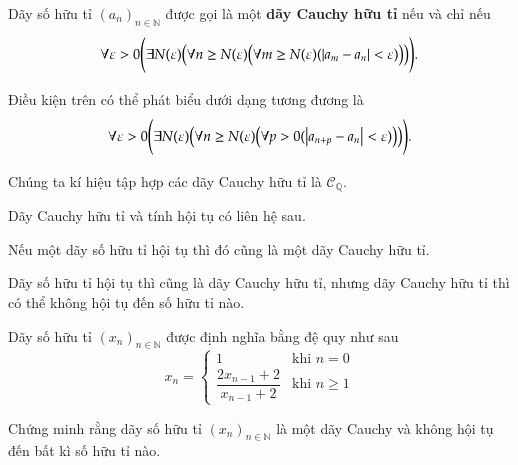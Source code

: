 \begin{definition}
	Dãy số hữu tỉ ${(a_{n})}_{n\in\mathbb{N}}$ được gọi là một \textbf{dãy Cauchy hữu tỉ} nếu và chỉ nếu
	\[
		\forall\varepsilon > 0 \Biggl( \exists N(\varepsilon) \Bigl( \forall n\geq N(\varepsilon) \bigl(\forall m\geq N(\varepsilon) (\left\vert{a_{m} - a_{n}}\right\vert < \varepsilon)\bigr) \Bigr) \Biggr).
	\]

	\noindent Điều kiện trên có thể phát biểu dưới dạng tương đương là
	\[
		\forall\varepsilon > 0 \Biggl( \exists N(\varepsilon) \Bigl( \forall n\geq N(\varepsilon) \bigl(\forall p > 0 (\left\vert{a_{n+p} - a_{n}}\right\vert < \varepsilon)\bigr) \Bigr) \Biggr).
	\]

	\noindent Chúng ta kí hiệu tập hợp các dãy Cauchy hữu tỉ là $\mathscr{C}_{\mathbb{Q}}$.
\end{definition}

Dãy Cauchy hữu tỉ và tính hội tụ có liên hệ sau.
\begin{theorem}
	Nếu một dãy số hữu tỉ hội tụ thì đó cũng là một dãy Cauchy hữu tỉ.
\end{theorem}

Dãy số hữu tỉ hội tụ thì cũng là dãy Cauchy hữu tỉ, nhưng dãy Cauchy hữu tỉ thì có thể không hội tụ đến số hữu tỉ nào.

\begin{proposition}
	Dãy số hữu tỉ ${(x_{n})}_{n\in\mathbb{N}}$ được định nghĩa bằng đệ quy như sau
	\[
		x_{n} = \begin{cases}
			1                                 & \text{khi $n = 0$}   \\
			\dfrac{2x_{n-1} + 2}{x_{n-1} + 2} & \text{khi $n\geq 1$}
		\end{cases}
	\]

	Chứng minh rằng dãy số hữu tỉ ${(x_{n})}_{n\in\mathbb{N}}$ là một dãy Cauchy và không hội tụ đến bất kì số hữu tỉ nào.
\end{proposition}

